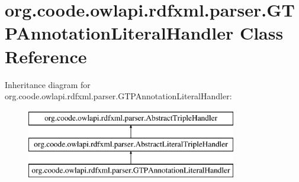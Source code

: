 \hypertarget{classorg_1_1coode_1_1owlapi_1_1rdfxml_1_1parser_1_1_g_t_p_annotation_literal_handler}{\section{org.\-coode.\-owlapi.\-rdfxml.\-parser.\-G\-T\-P\-Annotation\-Literal\-Handler Class Reference}
\label{classorg_1_1coode_1_1owlapi_1_1rdfxml_1_1parser_1_1_g_t_p_annotation_literal_handler}
}
Inheritance diagram for org.\-coode.\-owlapi.\-rdfxml.\-parser.\-G\-T\-P\-Annotation\-Literal\-Handler\-:\begin{figure}[H]
\begin{center}
\leavevmode
\includegraphics[height=3.000000cm]{classorg_1_1coode_1_1owlapi_1_1rdfxml_1_1parser_1_1_g_t_p_annotation_literal_handler}
\end{center}
\end{figure}
